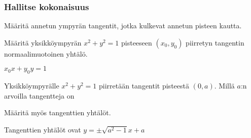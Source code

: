 \begin{tehtavasivu}
\subsubsection*{Hallitse kokonaisuus}
\begin{tehtava}
	Määritä annetun ympyrän tangentit, jotka kulkevat annetun pisteen kautta.
	\begin{alakohdat}
	\end{alakohdat}
	\begin{vastaus}
		\begin{alakohdat}
			\alakohta{$y=x-2$ ja $y=-x$}
			\alakohta{$y= -1/4 x -3$}
			\alakohta{$y=1$ ja $x=3$}
			\alakohta{Ei ole.}
		\end{alakohdat}
	\end{vastaus}
\end{tehtava}

\begin{tehtava}
Määritä yksikköympyrän $x^2+y^2= 1$ pisteeseen $(x_{0}, y_{0} )$ piirretyn tangentin normaalimuotoinen yhtälö.
\begin{vastaus}
$x_0x+y_0y=1 $
\end{vastaus}
\end{tehtava}

\begin{tehtava}
Yksikköympyrälle $x^2+y^2=1$ piirretään tangentit pisteestä $(0, a)$. Millä $a$:n arvoilla tangentteja on 
\begin{alakohdat}
\end{alakohdat}
Määritä myös tangenttien yhtälöt.
\begin{vastaus}
\begin{alakohdat}
\end{alakohdat}
Tangenttien yhtälöt ovat $ y = \pm \sqrt{a^2-1}x+a$
\end{vastaus}
\end{tehtava}

\begin{tehtava}
\begin{alakohdat}
\end{alakohdat}


\end{tehtava}
\end{tehtavasivu}
